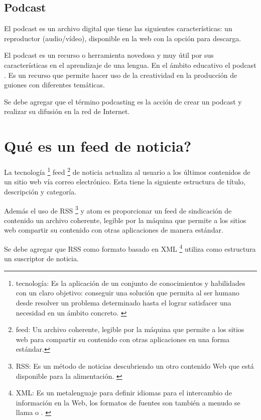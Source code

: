 \subsection{Podcast}

El podcast es un archivo digital que tiene las siguientes características: un
reproductor (audio/vídeo), disponible en la web con la opción para descarga.

El podcast es un recurso o herramienta novedosa y muy útil por sus
características en el aprendizaje de una lengua. En el ámbito educativo el
podcast 
\cite{chacon2011podcast}. Es un recurso que permite hacer uso de la
creatividad en la producción de guiones con diferentes temáticas.
\cite{AFSTVV2014}

Se debe agregar que el término podcasting es la acción de crear un podcast y
realizar su difusión en la red de Internet.

\section{\textquestiondown Qué es un feed de noticia?}

La tecnología \footnote{tecnología: Es la aplicación de un conjunto de
conocimientos y habilidades con un claro objetivo: conseguir una solución que
permita al ser humano desde resolver un problema determinado hasta el lograr
satisfacer una necesidad en un ámbito concreto. \cite{technology}} feed
\footnote{feed: Un archivo coherente, legible por la máquina que
permite a los sitios web para compartir su contenido con otras aplicaciones en
una forma estándar.\cite{hammersley2005developing}} de noticia
actualiza al usuario a los últimos contenidos de un sitio web vía correo
electrónico. Esta tiene la siguiente estructura de título, descripción y
categoría.

Además el uso de RSS \footnote{RSS: Es un método de noticias descubriendo
un otro contenido Web que está disponible para la alimentación.
\cite{zeki2004rss}} y atom es proporcionar un feed de sindicación de
contenido un archivo coherente, legible por la máquina que permite a los
sitios web compartir su contenido con otras aplicaciones de manera estándar. \cite{hammersley2005developing}

Se debe agregar que RSS como formato basado en XML \footnote{XML: Es un
metalenguaje para definir idiomas para el intercambio de información en la
Web, los formatos de fuentes son también a menudo se llama
 o .
\cite{wittenbrink2005rss}} utiliza como estructura un suscriptor de noticia.

